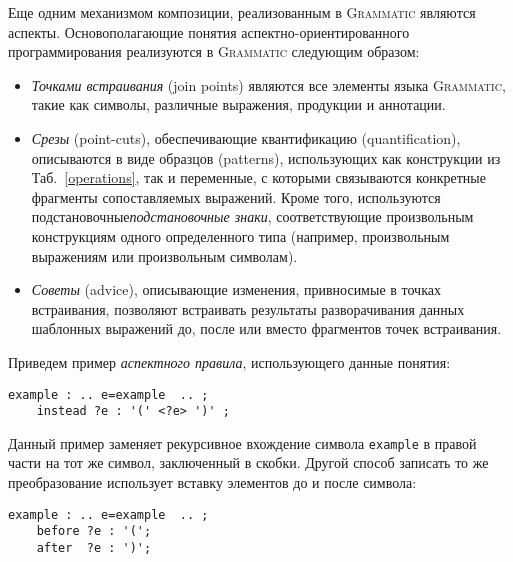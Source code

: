 \documentclass[12pt,a4paper]{article}
\newcommand{\tabref}[1]{Таб.~\ref{#1}}
\newcommand{\term}[1]{\emph{#1}}
\newcommand{\code}[1]{\mbox{\texttt{#1}}}
\newcommand{\tool}[1]{\textsc{#1}}
\theoremstyle{definition}
\theoremstyle{plain}
\newcommand{\GRM}{\tool{Grammatic}}
\begin{document}
Еще одним механизмом композиции, реализованным в \GRM{} являются аспекты. 
Основополагающие понятия аспектно-ориентированного программирования реализуются в \GRM{} следующим образом:
\begin{itemize}
\item \term{Точками встраивания} (join points) являются все элементы языка \GRM{}, такие как символы, различные выражения, продукции и аннотации.
\item \term{Срезы} (point-cuts), обеспечивающие квантификацию (quantification), описываются в виде образцов (patterns), использующих как конструкции из \tabref{operations}, так и переменные, с которыми связываются конкретные фрагменты сопоставляемых выражений. Кроме того, используются подстановочные\term{подстановочные знаки}, соответствующие произвольным конструкциям одного определенного типа (например, произвольным выражениям или произвольным символам).
\item \term{Советы} (advice), описывающие изменения, привносимые в точках встраивания, позволяют встраивать результаты разворачивания данных шаблонных выражений до, после или вместо фрагментов точек встраивания.
\end{itemize}
Приведем пример \term{аспектного правила}, использующего данные понятия:
\begin{lstlisting}
example : .. e=example  .. ;
	instead ?e : '(' <?e> ')' ;
\end{lstlisting}
Данный пример заменяет рекурсивное вхождение символа \code{example} в правой части на тот же символ, заключенный в скобки. Другой способ записать то же преобразование использует вставку элементов до и после символа:
\begin{lstlisting}
example : .. e=example  .. ;
	before ?e : '(';
	after  ?e : ')';
\end{lstlisting}
\end{document}

